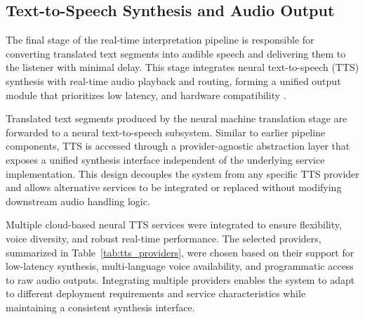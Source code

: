 \subsection{Text-to-Speech Synthesis and Audio Output}

The final stage of the real-time interpretation pipeline is responsible for converting translated text segments into audible speech and delivering them to the listener with minimal delay. This stage integrates neural text-to-speech (TTS) synthesis with real-time audio playback and routing, forming a unified output module that prioritizes low latency, and hardware compatibility \cite{tan2021tts_survey, conference_interpreting_new_tech}.

Translated text segments produced by the neural machine translation stage are forwarded to a neural text-to-speech subsystem. Similar to earlier pipeline components, TTS is accessed through a provider-agnostic abstraction layer that exposes a unified synthesis interface independent of the underlying service implementation. This design decouples the system from any specific TTS provider and allows alternative services to be integrated or replaced without modifying downstream audio handling logic.

Multiple cloud-based neural TTS services were integrated to ensure flexibility, voice diversity, and robust real-time performance. The selected providers, summarized in Table~\ref{tab:tts_providers}, were chosen based on their support for low-latency synthesis, multi-language voice availability, and programmatic access to raw audio outputs. Integrating multiple providers enables the system to adapt to different deployment requirements and service characteristics while maintaining a consistent synthesis interface.

